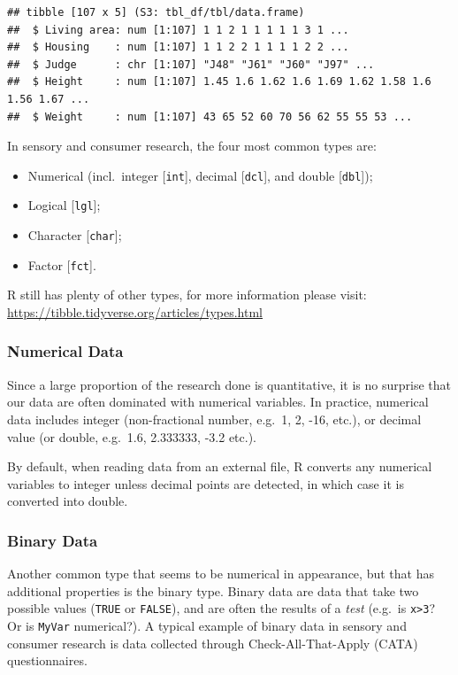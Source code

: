 \documentclass[
]{krantz}
\providecommand{\tightlist}{%
  \setlength{\itemsep}{0pt}\setlength{\parskip}{0pt}}
\begin{document}
\begin{verbatim}
## tibble [107 x 5] (S3: tbl_df/tbl/data.frame)
##  $ Living area: num [1:107] 1 1 2 1 1 1 1 1 3 1 ...
##  $ Housing    : num [1:107] 1 1 2 2 1 1 1 1 2 2 ...
##  $ Judge      : chr [1:107] "J48" "J61" "J60" "J97" ...
##  $ Height     : num [1:107] 1.45 1.6 1.62 1.6 1.69 1.62 1.58 1.6 1.56 1.67 ...
##  $ Weight     : num [1:107] 43 65 52 60 70 56 62 55 55 53 ...
\end{verbatim}

In sensory and consumer research, the four most common types are:

\begin{itemize}
\tightlist
\item
  Numerical (incl.~integer {[}\texttt{int}{]}, decimal {[}\texttt{dcl}{]}, and double {[}\texttt{dbl}{]});
\item
  Logical {[}\texttt{lgl}{]};
\item
  Character {[}\texttt{char}{]};
\item
  Factor {[}\texttt{fct}{]}.
\end{itemize}

R still has plenty of other types, for more information please visit: \url{https://tibble.tidyverse.org/articles/types.html}

\hypertarget{numerical-data}{%
\subsubsection*{Numerical Data}\label{numerical-data}}


Since a large proportion of the research done is quantitative, it is no surprise that our data are often dominated with numerical variables. In practice, numerical data includes integer (non-fractional number, e.g.~1, 2, -16, etc.), or decimal value (or double, e.g.~1.6, 2.333333, -3.2 etc.).

By default, when reading data from an external file, R converts any numerical variables to integer unless decimal points are detected, in which case it is converted into double.

\hypertarget{binary-data}{%
\subsubsection*{Binary Data}\label{binary-data}}


Another common type that seems to be numerical in appearance, but that has additional properties is the binary type.
Binary data are data that take two possible values (\texttt{TRUE} or \texttt{FALSE}), and are often the results of a \emph{test} (e.g.~is \texttt{x\textgreater{}3}? Or is \texttt{MyVar} numerical?). A typical example of binary data in sensory and consumer research is data collected through Check-All-That-Apply (CATA) questionnaires.
\end{document}

